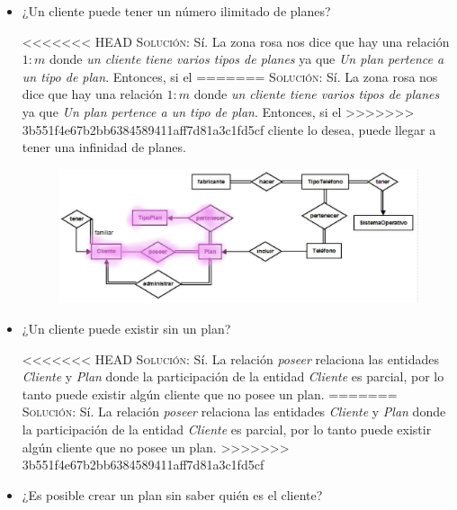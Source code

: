 \documentclass[letterpaper,11pt]{article}
\begin{document}
\begin{itemize}
    \item ¿Un cliente puede tener un número ilimitado de planes?

<<<<<<< HEAD
    \textsc{Solución:} Sí. La zona rosa nos dice que hay una relación $1:m$
    donde \textit{un cliente tiene varios tipos de planes} ya que
    \textit{Un plan pertence a un tipo de plan}. Entonces, si el
=======
    \textsc{Solución:} Sí. La zona rosa nos dice que hay una relación $1:m$ 
    donde \textit{un cliente tiene varios tipos de planes} ya que 
    \textit{Un plan pertence a un tipo de plan}. Entonces, si el 
>>>>>>> 3b551f4e67b2bb6384589411aff7d81a3c1fd5cf
    cliente lo desea, puede llegar a tener una infinidad de planes.

    \begin{figure}[h]
        \centering
        \includegraphics[scale=0.4]{./imagenes/modelo1.jpg}
    \end{figure}

    \item ¿Un cliente puede existir sin un plan?

<<<<<<< HEAD
    \textsc{Solución:} Sí. La relación \textit{poseer} relaciona las entidades \textit{Cliente} y \textit{Plan} donde la participación de la entidad \textit{Cliente} es parcial, por lo tanto puede existir algún cliente que no posee un plan.
=======
    \textsc{Solución:} Sí. La relación \textit{poseer} relaciona las entidades \textit{Cliente} y \textit{Plan} donde la participación de la entidad \textit{Cliente} es parcial, por lo tanto puede existir algún cliente que no posee un plan. 
>>>>>>> 3b551f4e67b2bb6384589411aff7d81a3c1fd5cf

    \item ¿Es posible crear un plan sin saber quién es el cliente?
    

\end{itemize}
\end{document}

